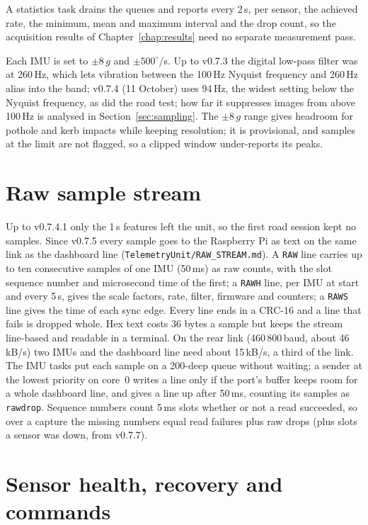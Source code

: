A statistics task drains the queues and reports every 2\,s, per sensor, the achieved rate, the minimum, mean and maximum interval and the drop count, so the acquisition results of Chapter~\ref{chap:results} need no separate measurement pass.

Each IMU is set to $\pm 8\,g$ and $\pm 500^{\circ}$/s. Up to v0.7.3 the digital low-pass filter was at 260\,Hz, which lets vibration between the 100\,Hz Nyquist frequency and 260\,Hz alias into the band; v0.7.4 (11 October) uses 94\,Hz, the widest setting below the Nyquist frequency, as did the road test; how far it suppresses images from above 100\,Hz is analysed in Section~\ref{sec:sampling}. The $\pm 8\,g$ range gives headroom for pothole and kerb impacts while keeping resolution; it is provisional, and samples at the limit are not flagged, so a clipped window under-reports its peaks.

\section{Raw sample stream}
\label{sec:impl-raw}

Up to v0.7.4.1 only the 1\,s features left the unit, so the first road session kept no samples. Since v0.7.5 every sample goes to the Raspberry Pi as text on the same link as the dashboard line (\texttt{TelemetryUnit/\allowbreak{}RAW\_\allowbreak{}STREAM.md}). A \texttt{RAW} line carries up to ten consecutive samples of one IMU (50\,ms) as raw counts, with the slot sequence number and microsecond time of the first; a \texttt{RAWH} line, per IMU at start and every 5\,s, gives the scale factors, rate, filter, firmware and counters; a \texttt{RAWS} line gives the time of each sync edge. Every line ends in a CRC-16 and a line that fails is dropped whole. Hex text costs 36 bytes a sample but keeps the stream line-based and readable in a terminal. On the rear link (460\,800\,baud, about 46\,kB/s) two IMUs and the dashboard line need about 15\,kB/s, a third of the link. The IMU tasks put each sample on a 200-deep queue without waiting; a sender at the lowest priority on core~0 writes a line only if the port's buffer keeps room for a whole dashboard line, and gives a line up after 50\,ms, counting its samples as \texttt{rawdrop}. Sequence numbers count 5\,ms slots whether or not a read succeeded, so over a capture the missing numbers equal read failures plus raw drops (plus slots a sensor was down, from v0.7.7).

\section{Sensor health, recovery and commands}
\label{sec:impl-health}

